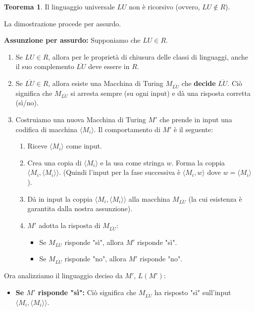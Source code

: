 \documentclass[a4paper]{article}
\makeatletter
\theoremstyle{definition} %
\newtheorem{theorem}{Teorema}
[section] %
\renewenvironment{proof}[1][\proofname]{\par
  \pushQED{\qed}%
  \normalfont \topsep6\p@\@plus6\p@\relax
  \trivlist
  \item[\hskip\labelsep
        \bfseries
    #1\@addpunct{.}]\ignorespaces
}{%
  \popQED\endtrivlist\@endpefalse
}
\makeatother
\begin{document}
\begin{theorem}
Il linguaggio universale $LU$ non è ricorsivo (ovvero, $LU \notin R$).
\end{theorem}
\begin{proof}
La dimostrazione procede per assurdo.

\textbf{Assunzione per assurdo:} Supponiamo che $LU \in R$.
\begin{enumerate}
    \item Se $LU \in R$, allora per le proprietà di chiusura delle classi di linguaggi, anche il suo complemento $\overline{LU}$ deve essere in $R$.
    \item Se $\overline{LU} \in R$, allora esiste una Macchina di Turing $M_{\overline{LU}}$ che \textbf{decide} $\overline{LU}$. Ciò significa che $M_{\overline{LU}}$ si arresta sempre (su ogni input) e dà una risposta corretta (sì/no).
    \item Costruiamo una nuova Macchina di Turing $M'$ che prende in input una codifica di macchina $\langle M_i \rangle$. Il comportamento di $M'$ è il seguente:
    \begin{enumerate}
        \item Riceve $\langle M_i \rangle$ come input.
        \item Crea una copia di $\langle M_i \rangle$ e la usa come stringa $w$. Forma la coppia $\langle M_i, \langle M_i \rangle \rangle$. (Quindi l'input per la fase successiva è $\langle M_i, w \rangle$ dove $w = \langle M_i \rangle$).
        \item Dà in input la coppia $\langle M_i, \langle M_i \rangle \rangle$ alla macchina $M_{\overline{LU}}$ (la cui esistenza è garantita dalla nostra assunzione).
        \item $M'$ adotta la risposta di $M_{\overline{LU}}$:
        \begin{itemize}
            \item Se $M_{\overline{LU}}$ risponde "sì", allora $M'$ risponde "sì".
            \item Se $M_{\overline{LU}}$ risponde "no", allora $M'$ risponde "no".
        \end{itemize}
    \end{enumerate}
\end{enumerate}
Ora analizziamo il linguaggio deciso da $M'$, $L(M')$:
\begin{itemize}
    \item \textbf{Se $M'$ risponde "sì":}
    Ciò significa che $M_{\overline{LU}}$ ha risposto "sì" sull'input $\langle M_i, \langle M_i \rangle \rangle$.

\end{itemize}
\end{proof}
\end{document}
